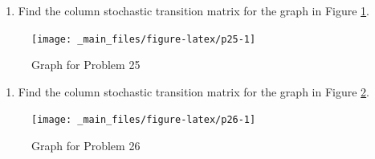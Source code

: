 \documentclass[
]{book}
\providecommand{\tightlist}{%
  \setlength{\itemsep}{0pt}\setlength{\parskip}{0pt}}
\theoremstyle{definition}
\theoremstyle{definition}
\theoremstyle{definition}
\theoremstyle{definition}
\theoremstyle{remark}
\begin{document}
\begin{enumerate}
\def\labelenumi{\arabic{enumi}.}
\setcounter{enumi}{24}
\tightlist
\item
  Find the column stochastic transition matrix for the graph in Figure \ref{fig:p25}.
\end{enumerate}

\begin{figure}

{\centering \texttt{[image: \_main\_files/figure-latex/p25-1]} 

}

\caption{Graph for Problem 25}\label{fig:p25}
\end{figure}

\begin{enumerate}
\def\labelenumi{\arabic{enumi}.}
\setcounter{enumi}{25}
\tightlist
\item
  Find the column stochastic transition matrix for the graph in Figure \ref{fig:p26}.
\end{enumerate}

\begin{figure}

{\centering \texttt{[image: \_main\_files/figure-latex/p26-1]} 

}

\caption{Graph for Problem 26}\label{fig:p26}
\end{figure}
\end{document}
